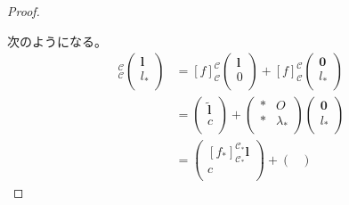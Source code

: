 \documentclass[dvipdfmx]{jsarticle}
\begin{document}
\begin{proof}
\begin{center}
\end{center}
次のようになる。
\begin{align*}
[ f]_{\mathcal{C}}^{\mathcal{C}}\begin{pmatrix}
\mathbf{l} \\
l_{*} \\
\end{pmatrix} &= [ f]_{\mathcal{C}}^{\mathcal{C}}\begin{pmatrix}
\mathbf{l} \\
0 \\
\end{pmatrix} + [ f]_{\mathcal{C}}^{\mathcal{C}}\begin{pmatrix}
\mathbf{0} \\
l_{*} \\
\end{pmatrix}\\
&= \begin{pmatrix}
\widetilde{\mathbf{l}} \\
c \\
\end{pmatrix} + \begin{pmatrix}
* & O \\
* & \lambda_{*} \\
\end{pmatrix}\begin{pmatrix}
\mathbf{0} \\
l_{*} \\
\end{pmatrix}\\
&= \begin{pmatrix}
\left[ f_{*} \right]_{\mathcal{C}_{*}}^{\mathcal{C}_{*}}\mathbf{l} \\
c \\
\end{pmatrix} + \begin{pmatrix}

\end{pmatrix}
\end{align*}
\end{proof}
\end{document}
